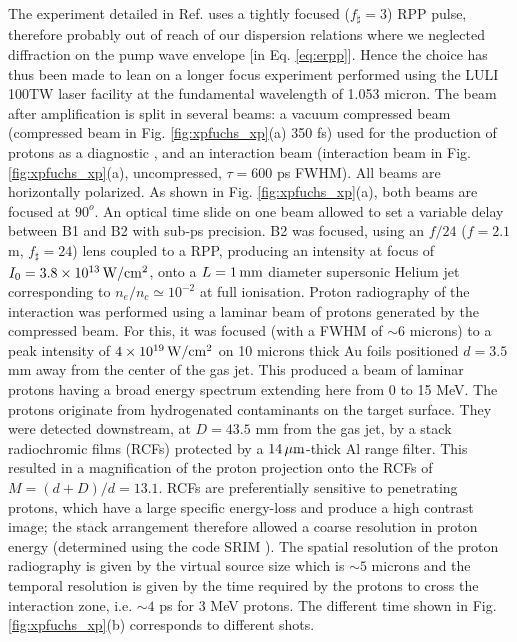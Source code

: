 \documentclass[
 reprint,
 amsmath,amssymb,
 aps,
]{revtex4-1}
\begin{document}
The experiment detailed in Ref. \cite[]{PRL_Sarri_2011} uses a tightly focused ($f_\sharp =3$) RPP pulse,  therefore probably out of reach of our dispersion relations where we neglected diffraction  on the pump wave envelope [in Eq. \eqref{eq:erpp}].
Hence the choice has thus been made to lean on 
a longer focus  experiment performed using the LULI 100TW laser facility at the fundamental wavelength of 1.053 micron. The beam after amplification is split in several beams: a vacuum compressed beam (compressed beam in Fig. \ref{fig:xpfuchs_xp}(a)  350 fs) used for the production of protons as a diagnostic \cite{RSI_Mackinnon_2004}, and an interaction beam (interaction beam in Fig. \ref{fig:xpfuchs_xp}(a),  uncompressed, $\tau=600$ ps FWHM). All beams are horizontally polarized. As shown in 
Fig. \ref{fig:xpfuchs_xp}(a), both beams are focused at $90^o$. An optical time slide on one beam allowed to set a variable delay between B1 and B2 with sub-ps precision. B2 was focused, using an $f/24$ ($f=2.1$ m, $f_\sharp=24$)  lens coupled to a RPP, producing an intensity at focus of $I_0=3.8\times 10^{13}\, \rm W/cm^2$, onto a $L=1\,\rm mm$ diameter supersonic Helium jet corresponding to  $n_e/n_c\simeq 10^{-2}$ at full ionisation. 
Proton radiography of the interaction was performed using a laminar beam of protons generated by the compressed beam.
For this, it was focused (with a FWHM of $\sim 6$ microns) to a peak intensity of $4\times 10^{19}\, \rm W/cm^2$ on 10 microns thick Au foils positioned $d=3.5$ mm away from the center of the gas jet. This produced  \cite{PRL_Snavely_2000} a beam of laminar protons having a broad energy spectrum extending here from 0 to 15 MeV. The protons originate from hydrogenated contaminants on the target surface. They were detected downstream, at $D=43.5$ mm from the gas jet, by a stack radiochromic films (RCFs) \cite{Bolton_2014}  protected by a $14\, \rm \mu m$-thick Al range filter. This resulted in a magniﬁcation of the proton projection onto the RCFs of $M=(d+D)/d =13.1$. RCFs are preferentially sensitive to penetrating protons, which have a large specific energy-loss and produce a high contrast image; the stack arrangement therefore allowed a coarse resolution in proton energy (determined using the code SRIM \cite{Ziegler_2010}). 
The spatial resolution of the proton radiography is given by the virtual source size which is $\sim 5$ microns \cite{PRL_Cowan_2004} and the temporal resolution is given by the time required by the protons to cross the interaction zone, i.e. $\sim 4$ ps for $3$ MeV protons. The different time shown in Fig. \ref{fig:xpfuchs_xp}(b) corresponds to different shots. 
\end{document}
